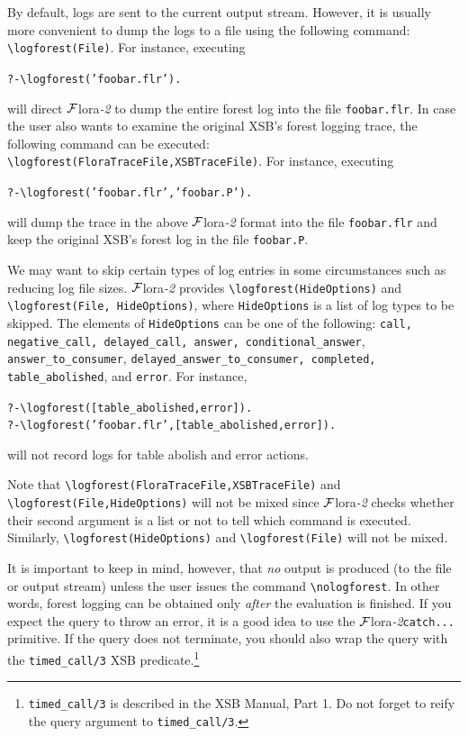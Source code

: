 \documentclass[11pt]{article}
\newcommand{\FLORA}{{\mbox{\sc ${\cal F}${lora}\rm\emph{-2}}}\xspace}
\newcommand{\FLSYSTEM}{\FLORA}
\newcommand{\flrext}{flr\xspace}
\newcommand{\bs}{\textbackslash}
\begin{document}
By default, logs are sent to the current output stream. However, it is
usually more convenient
to dump the logs to a file using the following command:
{\tt \bs{}logforest(File)}. For instance, executing
\begin{alltt}
   ?- \bs{}logforest('foobar.\flrext').
\end{alltt}
will direct \FLSYSTEM to dump the entire forest log into the file {\tt foobar.\flrext}.
In case the user also wants to examine the original XSB's forest
logging trace, the following command can be executed: 
{\tt \bs{}logforest(FloraTraceFile,XSBTraceFile)}. For instance, executing
\begin{alltt}
   ?- \bs{}logforest('foobar.\flrext', 'foobar.P').
\end{alltt}
will dump the trace in the above \FLSYSTEM format into the file {\tt foobar.\flrext}
and keep the original XSB's forest log in the file {\tt foobar.P}. 

We may want to skip certain types of log entries in some circumstances such
as reducing log file sizes. \FLSYSTEM provides {\tt \bs{}logforest(HideOptions)} and 
{\tt \bs{}logforest(File, HideOptions)}, where {\tt HideOptions} is a list of log
types to be skipped.
The elements of {\tt HideOptions} can be one of the following:
\texttt{call,
  negative\_call, delayed\_call,  answer, conditional\_answer},
  \texttt{answer\_to\_consumer}, \texttt{delayed\_answer\_to\_consumer, completed,
  table\_abolished}, and {\tt error}. For instance,  
\begin{alltt}
   ?- \bs{}logforest([table_abolished, error]).
   ?- \bs{}logforest('foobar.\flrext', [table_abolished, error]).
\end{alltt}
will not record logs for table abolish and error actions. 

Note that {\tt \bs{}logforest(FloraTraceFile,XSBTraceFile)} and 
{\tt \bs{}logforest(File,HideOptions)} will not be mixed since \FLSYSTEM
checks whether their second argument is a list or not to tell
which command is executed. 
Similarly, {\tt \bs{}logforest(HideOptions)} and {\tt \bs{}logforest(File)}
will not be mixed.

It is important to keep in mind, however, that \emph{no} output
is produced (to the file or output stream) unless the user issues the command
{\tt \bs{}nologforest}. In other words, forest logging can be obtained only
\emph{after} the evaluation is finished. 
If you expect the query to throw an error, it is a good idea to use the
\FLSYSTEM \texttt{catch{...}} primitive. If the query does not terminate,
you should also wrap the query with the \texttt{timed\_call/3} XSB predicate.\footnote{
  \texttt{timed\_call/3} is described in the XSB Manual, Part 1. Do not
  forget to reify the query argument to  \texttt{timed\_call/3}.
  }
\end{document}
